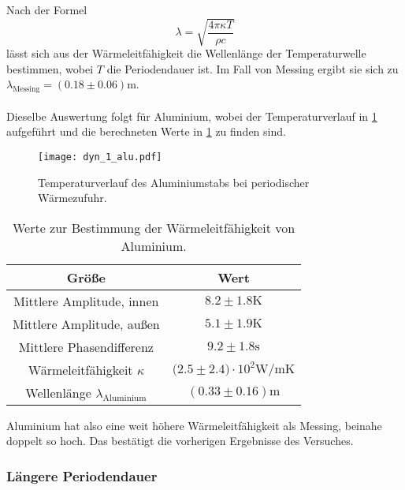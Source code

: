   \FloatBarrier
  \noindent Nach der Formel
  \begin{equation*}
    \lambda = \sqrt{\frac{4 \pi \kappa T}{\rho c}}
  \end{equation*}
  lässt sich aus der Wärmeleitfähigkeit die Wellenlänge der Temperaturwelle bestimmen, wobei $T$ die Periodendauer ist. 
  Im Fall von Messing ergibt sie sich zu $\lambda_{\text{Messing}} = (0.18 \pm 0.06) \si{\m}$.\\
  \\
  
  \noindent Dieselbe Auswertung folgt für Aluminium, wobei der Temperaturverlauf in \ref{fig:aludyn} aufgeführt und die berechneten Werte in \ref{tab:kappaalu} zu finden sind.

  \begin{figure}
    \centering
    \texttt{[image: dyn\_1\_alu.pdf]}
    \caption{Temperaturverlauf des Aluminiumstabs bei periodischer Wärmezufuhr.}
    \label{fig:aludyn}
  \end{figure}

  \begin{table}
    \centering
    \caption{Werte zur Bestimmung der Wärmeleitfähigkeit von Aluminium.}
    \label{tab:kappaalu}
    \begin{tabular}{c c }
      \toprule
      Größe & Wert \\
      \midrule %
      Mittlere Amplitude, innen & $8.2 \pm 1.8 \si{\kelvin}$\\
      Mittlere Amplitude, außen & $5.1 \pm 1.9 \si{\kelvin}$\\
      Mittlere Phasendifferenz & $9.2 \pm 1.8 \si{\s}$ \\
      Wärmeleitfähigkeit $\kappa$ & $\bigl(2.5 \pm 2.4\bigr) \cdot 10^{2} \si{\watt\per\m\kelvin}$ \\ %
      Wellenlänge $\lambda_{\text{Aluminium}}$ & $(0.33 \pm 0.16) \si{\m} $\\ 
      \bottomrule
    \end{tabular}
  \end{table}

  \FloatBarrier

  \noindent Aluminium hat also eine weit höhere Wärmeleitfähigkeit als Messing, beinahe doppelt so hoch. Das bestätigt die vorherigen Ergebnisse des Versuches.

  \subsubsection{Längere Periodendauer}

